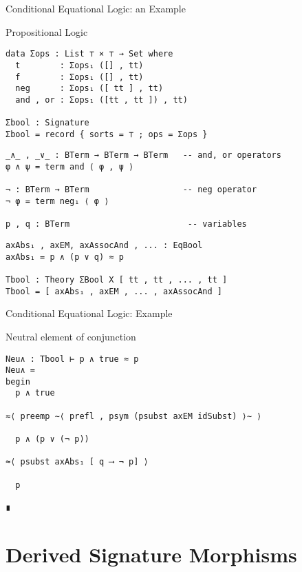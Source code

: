 \documentclass[11pt]{beamer}
\begin{document}
\begin{frame}[fragile]{Conditional Equational Logic: an Example}

  \begin{block}{Propositional Logic}
    \begin{verbatim}
data Σops : List ⊤ × ⊤ → Set where
  t        : Σops₁ ([] , tt)
  f        : Σops₁ ([] , tt)
  neg      : Σops₁ ([ tt ] , tt)
  and , or : Σops₁ ([tt , tt ]) , tt)

Σbool : Signature
Σbool = record { sorts = ⊤ ; ops = Σops }
\end{verbatim}
%
\pause
%    
\begin{verbatim}
_∧_ , _∨_ : BTerm → BTerm → BTerm   -- and, or operators
φ ∧ ψ = term and ⟨ φ , ψ ⟩
  
¬ : BTerm → BTerm                   -- neg operator
¬ φ = term neg₁ ⟨ φ ⟩   

p , q : BTerm                        -- variables
\end{verbatim}
\pause
\begin{verbatim}
axAbs₁ , axEM, axAssocAnd , ... : EqBool
axAbs₁ = p ∧ (p ∨ q) ≈ p

Tbool : Theory ΣBool X [ tt , tt , ... , tt ]
Tbool = [ axAbs₁ , axEM , ... , axAssocAnd ]
\end{verbatim}
    
\end{block}
\end{frame}

\begin{frame}[fragile]{Conditional Equational Logic: Example}

\begin{block}{Neutral element of conjunction}
\begin{verbatim}
Neu∧ : Tbool ⊢ p ∧ true ≈ p
Neu∧ =
begin
  p ∧ true

≈⟨ preemp ∼⟨ prefl , psym (psubst axEM idSubst) ⟩∼ ⟩

  p ∧ (p ∨ (¬ p))

≈⟨ psubst axAbs₁ [ q ⟶ ¬ p] ⟩

  p

∎
\end{verbatim}
\end{block}
\end{frame}



\section{Derived Signature Morphisms}
\end{document}
